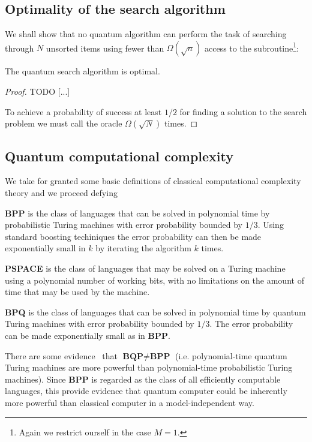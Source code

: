 \subsection{Optimality of the search algorithm}
We shall show that no quantum algorithm can perform the task of searching through $N$ unsorted items using fewer than $\Omega(\sqrt{n})$ access to the subroutine\footnote{Again we restrict ourself in the case $M=1$.}:
\begin{theorem}
The quantum search algorithm is optimal. 
\end{theorem}
\begin{proof}
TODO [...]

To achieve a probability of success at least $1/2$ for finding a solution to the search problem we must call the oracle $\Omega(\sqrt{N})$ times.
\end{proof}

\subsection{Quantum computational complexity}
We take for granted some basic definitions of classical computational complexity theory and we proceed defying
\begin{defn}
\textbf{BPP} is the class of languages that can be solved in polynomial time by probabilistic Turing machines with error probability bounded by $1/3$. Using standard boosting techiniques the error probability can then be made exponentially small in $k$ by iterating the algorithm $k$ times.
\end{defn}
\begin{defn}
\textbf{PSPACE} is the class of languages that may be solved on a Turing machine using a polynomial number of working bits, with no limitations on the amount of time that may be used by the machine.
\end{defn}
\begin{defn}
\textbf{BPQ} is the class of languages that can be solved in polynomial time by quantum Turing machines with error probability bounded by $1/3$. The error probability can be made exponentially small as in \textbf{BPP}.
\end{defn}
There are some evidence~\cite{Bennett_1997} that $\textbf{BQP} \neq \textbf{BPP}$ (i.e. polynomial-time quantum Turing machines are more powerful than polynomial-time probabilistic Turing machines). Since \textbf{BPP} is regarded as the class of all efficiently computable languages, this provide evidence that quantum computer could be inherently more powerful than classical computer in a model-independent way.

